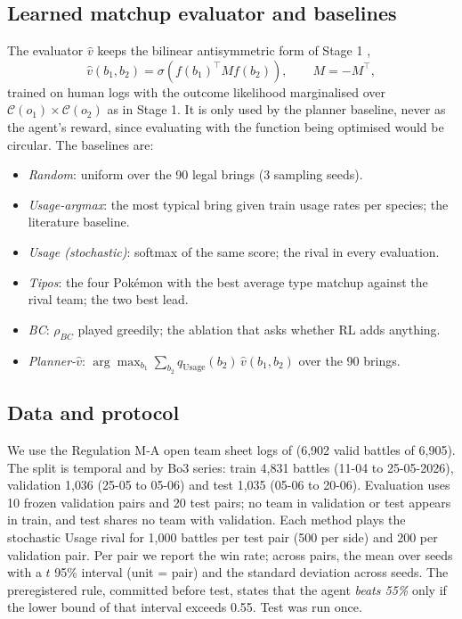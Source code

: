 \documentclass[conference]{IEEEtran}
\begin{document}
\subsection{Learned matchup evaluator and baselines}
The evaluator $\hat v$ keeps the bilinear antisymmetric form of Stage 1 \cite{oblander2025},
\begin{equation}
\hat{v}(b_1, b_2) = \sigma\!\left( f(b_1)^{\top} M f(b_2) \right), \qquad M = -M^{\top},
\label{eq:bilinear}
\end{equation}
trained on human logs with the outcome likelihood marginalised over $\mathcal{C}(o_1)\times\mathcal{C}(o_2)$
as in Stage 1. It is only used by the planner baseline, never as the agent's reward, since evaluating with the
function being optimised would be circular. The baselines are:
\begin{itemize}
\item \emph{Random}: uniform over the 90 legal brings (3 sampling seeds).
\item \emph{Usage-argmax}: the most typical bring given train usage rates per species; the literature baseline.
\item \emph{Usage (stochastic)}: softmax of the same score; the rival in every evaluation.
\item \emph{Tipos}: the four Pok\'emon with the best average type matchup against the rival team; the two best lead.
\item \emph{BC}: $\rho_{BC}$ played greedily; the ablation that asks whether RL adds anything.
\item \emph{Planner-$\hat v$}: $\arg\max_{b_1} \sum_{b_2} q_{\text{Usage}}(b_2)\,\hat v(b_1,b_2)$ over the 90 brings.
\end{itemize}

\subsection{Data and protocol}
We use the Regulation M-A open team sheet logs of \cite{angliss2026} (6{,}902 valid battles of 6{,}905). The
split is temporal and by Bo3 series: train 4{,}831 battles (11-04 to 25-05-2026), validation 1{,}036
(25-05 to 05-06) and test 1{,}035 (05-06 to 20-06). Evaluation uses 10 frozen validation pairs and 20 test
pairs; no team in validation or test appears in train, and test shares no team with validation. Each method
plays the stochastic Usage rival for 1{,}000 battles per test pair (500 per side) and 200 per validation pair.
Per pair we report the win rate; across pairs, the mean over seeds with a $t$ 95\% interval (unit = pair) and
the standard deviation across seeds. The preregistered rule, committed before test, states that the agent
\emph{beats 55\%} only if the lower bound of that interval exceeds 0.55. Test was run once.
\end{document}
